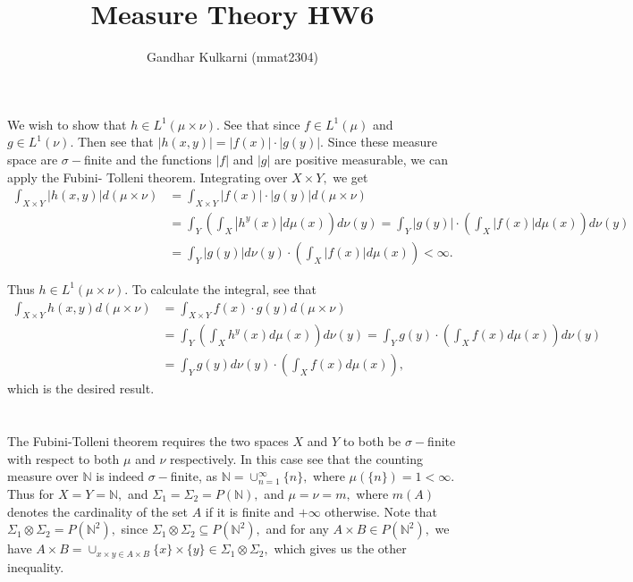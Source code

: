 \documentclass{article}
\title{Measure Theory HW6} %
\author{Gandhar Kulkarni (mmat2304)} %
\date{} %
\begin{document}
\maketitle %

\section{} %
We wish to show that $h \in L^1(\mu \times \nu).$ See that since $f \in L^1(\mu)$ and $g \in L^1(\nu).$ Then see that $|h(x,y)|=|f(x)|\cdot |g(y)|.$ Since these measure space are $\sigma-$finite and the functions $|f|$ and $|g|$ are positive measurable, we can apply the Fubini- Tolleni theorem. Integrating over $X \times Y,$ we get 
\begin{align*}
\int_{X \times Y} |h(x,y)| d(\mu \times \nu) &= \int_{X \times Y}|f(x)|\cdot |g(y)| d(\mu \times \nu)\\
&= \int_Y \left( \int_X |h^{y}(x)| d\mu(x) \right) d\nu(y)= \int_Y |g(y)| \cdot \left( \int_X |f(x)| d\mu(x) \right) d\nu(y)\\
&= \int_Y |g(y)| d\nu(y) \cdot \left( \int_X |f(x)| d\mu(x) \right) < \infty.
\end{align*}

Thus $h \in L^1(\mu \times \nu).$ To calculate the integral, see that 
\begin{align*}
	\int_{X \times Y} h(x,y) d(\mu \times \nu) &= \int_{X \times Y}f(x)\cdot g(y) d(\mu \times \nu)\\
	&= \int_Y \left( \int_X h^{y}(x) d\mu(x) \right) d\nu(y)= \int_Y g(y) \cdot \left( \int_X f(x) d\mu(x) \right) d\nu(y)\\
	&= \int_Y g(y) d\nu(y) \cdot \left( \int_X f(x) d\mu(x) \right),
\end{align*}
which is the desired result.


\section{} \label{Prob2} %
The Fubini-Tolleni theorem requires the two spaces $X$ and $Y$ to both be $\sigma-$finite with respect to both $\mu$ and $\nu$ respectively. In this case see that the counting measure over $\mathbb{N}$ is indeed $\sigma-$finite, as $\mathbb{N}=\cup_{n=1}^{\infty} \{n\},$ where $\mu(\{n\})=1 < \infty.$ Thus for $X=Y=\mathbb{N},$ and $\Sigma_1=\Sigma_2=P(\mathbb{N}),$ and $\mu=\nu =m,$ where $m(A)$ denotes the cardinality of the set $A$ if it is finite and $+\infty$ otherwise. Note that $\Sigma_1 \otimes \Sigma_2= P(\mathbb{N}^2),$ since $\Sigma_1 \otimes \Sigma_2 \subseteq P(\mathbb{N}^2),$ and for any $ A \times B \in P(\mathbb{N}^2),$ we have $A \times B= \cup_{x\times y \in A \times B} \{x\} \times \{y\} \in \Sigma_1 \otimes \Sigma_2,$ which gives us the other inequality. 
\end{document}
